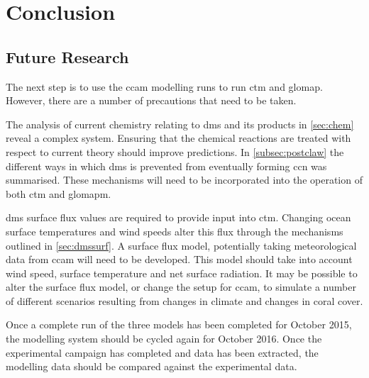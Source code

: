 \chapter{Conclusion}
\label{ch:conc}

\section{Future Research}
\label{sec:futureres}

The next step is to use the \gls{ccam} modelling runs to run \gls{ctm} and \gls{glomap}. However, there are a number of precautions that need to be taken.

The analysis of current chemistry relating to \gls{dms} and its products in \cref{sec:chem} reveal a complex system. Ensuring that the chemical reactions are treated with respect to current theory should improve predictions. In \cref{subsec:postclaw} the different ways in which \gls{dms} is prevented from eventually forming \gls{ccn} was summarised. These mechanisms will need to be incorporated into the operation of both \gls{ctm} and \gls{glomapm}.

\gls{dms} surface flux values are required to provide input into \gls{ctm}. Changing ocean surface temperatures and wind speeds alter this flux through the mechanisms outlined in \cref{sec:dmssurf}. A surface flux model, potentially taking meteorological data from \gls{ccam} will need to be developed. This model should take into account wind speed, surface temperature and net surface radiation. It may be possible to alter the surface flux model, or change the setup for \gls{ccam}, to simulate a number of different scenarios resulting from changes in climate and changes in coral cover.

Once a complete run of the three models has been completed for October 2015, the modelling system should be cycled again for October 2016. Once the experimental campaign has completed and data has been extracted, the modelling data should be compared against the experimental data.

